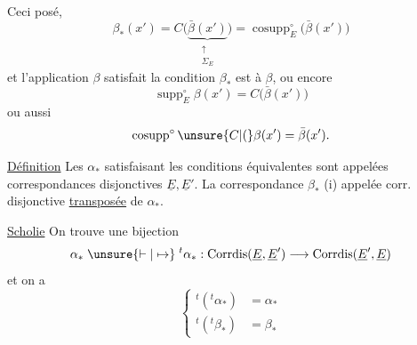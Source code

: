 Ceci posé,  
\[
\beta_{\ast}(x')=C\bigl(\underbrace{\bar{\beta}(x')}_{\substack{\uparrow\\ \mathbb{\Sigma}_{E}}}\bigr)=\operatorname{cosupp}_{E}^{\circ}\bigl(\bar{\beta}(x')\bigr)
\]
et l'application $\beta$   satisfait la condition   $\beta_{\ast}$ est  à $\beta$, ou encore
\[
\operatorname{supp}_{E}^{\circ}\beta(x')=C\bigl(\bar{\beta}(x')\bigr)
\]
ou aussi
\[
\operatorname{cosupp}^{\circ}\unsure{C|(}\beta(x')=\bar{\beta}(x').
\]

\uline{Définition} Les $\alpha_{\ast}$ satisfaisant les conditions équivalentes    sont appelées correspondances disjonctives  $\underline{E},\underline{E}'$. La correspondance $\beta_{\ast}$  (i)   appelée  corr. disjonctive  \uline{transposée} de $\alpha_{\ast}$.

\uline{Scholie} On trouve  une bijection
\[
\alpha_{\ast}\mathrel{\unsure{\vdash|\mapsto}}{}^{t}\alpha_{\ast}:\operatorname{Corrdis}(\underline{E},\underline{E}')\longrightarrow\operatorname{Corrdis}(\underline{E}',\underline{E})
\]
et on a
\[
\left\{\begin{aligned}
{}^{t}({}^{t}\alpha_{\ast})&=\alpha_{\ast}\\
{}^{t}({}^{t}\beta_{\ast})&=\beta_{\ast}
\end{aligned}\right.
\]
